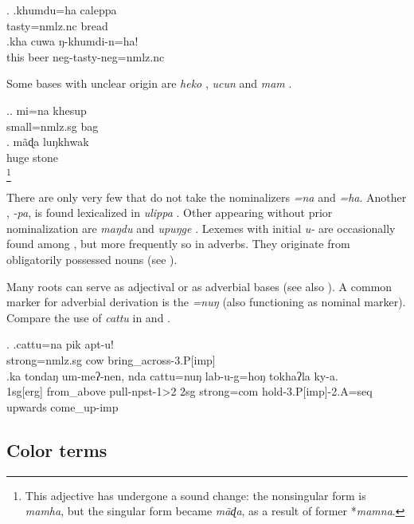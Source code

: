 \ex. \ag.khumdu=ha caleppa\\
tasty{\sc =nmlz.nc} bread\\
\bg.kha cuwa ŋ-khumdi-n=ha!\\
this beer {\sc neg-}tasty{\sc -neg=nmlz.nc}\\

  
Some bases with  unclear origin are \emph{heko} , \emph{ucun}  and \emph{mam} .

\ex.\ag. mi=na khesup\\
small{\sc =nmlz.sg} bag\\
\bg. mãɖa luŋkhwak\\
	huge{\sc [nmlz.sg]} stone\\
	\footnote{This adjective has undergone a sound change: the nonsingular form is \emph{mamha}, but the singular form became \emph{mãɖa}, as a result of former *\emph{mamna}.}

	
There are only very few  that do not take the nominalizers \emph{=na} and \emph{=ha}. Another , \emph{-pa}, is found lexicalized in \emph{ulippa} . Other  appearing without prior nominalization are \mbox{\emph{maŋdu}}  and \emph{upuŋge} . Lexemes with initial \emph{u-} are occasionally found among , but more frequently so in adverbs. They originate from obligatorily possessed nouns (see ).


	Many roots can serve as adjectival or as adverbial bases (see also  ). A common marker for adverbial derivation is the  \emph{=nuŋ} (also functioning as nominal  marker). Compare the use of \emph{cattu} in \Next[a] and \Next[b].
	
	\ex. \ag.cattu=na pik apt-u!\\
	strong{\sc =nmlz.sg} cow bring\_across{\sc -3.P[imp]}\\
	\bg.ka       tondaŋ    um-meʔ-nen,       nda cattu=nuŋ    lab-u-g=hoŋ                tokhaʔla ky-a.\\
	{\sc 1sg[erg]} from\_above pull{\sc -npst-1>2} {\sc 2sg} strong{\sc =com} hold{\sc -3.P[imp]-2.A=seq} upwards come\_up{\sc -imp}\\
	 

	
\subsection{Color terms}\label{sec-color}

